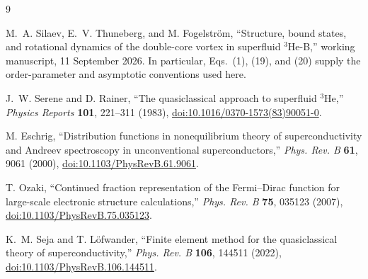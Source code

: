 \documentclass[11pt,a4paper]{article}
\begin{document}
\begin{thebibliography}{9}

M.~A. Silaev, E.~V. Thuneberg, and M. Fogelstr\"om,
``Structure, bound states, and rotational dynamics of the double-core vortex
in superfluid $^3$He-B,'' working manuscript, 11 September 2026.  In
particular, Eqs.~(1), (19), and (20) supply the order-parameter and asymptotic
conventions used here.

J.~W. Serene and D. Rainer,
``The quasiclassical approach to superfluid $^3$He,''
\emph{Physics Reports} \textbf{101}, 221--311 (1983),
\href{https://doi.org/10.1016/0370-1573(83)90051-0}
{doi:10.1016/0370-1573(83)90051-0}.

M. Eschrig,
``Distribution functions in nonequilibrium theory of superconductivity and
Andreev spectroscopy in unconventional superconductors,''
\emph{Phys. Rev. B} \textbf{61}, 9061 (2000),
\href{https://doi.org/10.1103/PhysRevB.61.9061}
{doi:10.1103/PhysRevB.61.9061}.

T. Ozaki,
``Continued fraction representation of the Fermi--Dirac function for
large-scale electronic structure calculations,''
\emph{Phys. Rev. B} \textbf{75}, 035123 (2007),
\href{https://doi.org/10.1103/PhysRevB.75.035123}
{doi:10.1103/PhysRevB.75.035123}.

K.~M. Seja and T. L\"ofwander,
``Finite element method for the quasiclassical theory of superconductivity,''
\emph{Phys. Rev. B} \textbf{106}, 144511 (2022),
\href{https://doi.org/10.1103/PhysRevB.106.144511}
{doi:10.1103/PhysRevB.106.144511}.

\end{thebibliography}
\end{document}
